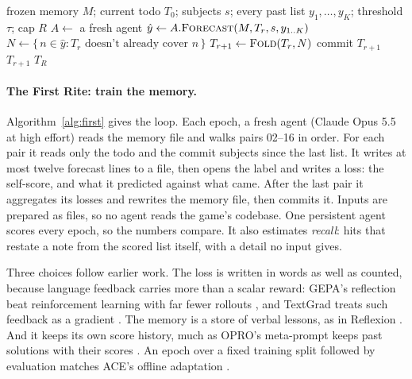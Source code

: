 \documentclass[10pt]{article}
\begin{document}
\begin{algorithm}[t]
  \caption{The Second Rite: freeze the memory, converge the todo}
  \label{alg:second}
  \small
  \begin{algorithmic}[1]
    \Require frozen memory $M$; current todo $T_0$; subjects $s$; every past list $y_1, \dots, y_K$; threshold $\tau$; cap $R$
      \State $A \gets$ a fresh agent 
      \State $\hat{y} \gets A.\textsc{Forecast}(M, T_r, s, y_{1..K})$ 
      \State $N \gets \{\, n \in \hat{y} : T_r \text{ doesn't already cover } n \,\}$ 
      \State $T_{r+1} \gets \textsc{Fold}(T_r, N)$ 
      \State commit $T_{r+1}$
        \State \Return $T_{r+1}$ 
      \EndIf
    \EndFor
    \State \Return $T_R$
  \end{algorithmic}
\end{algorithm}

\paragraph{The First Rite: train the memory.} Algorithm~\ref{alg:first} gives the loop. Each epoch, a fresh agent (Claude Opus 5.5 at high effort) reads the memory file and walks pairs 02--16 in order. For each pair it reads only the todo and the commit subjects since the last list. It writes at most twelve forecast lines to a file, then opens the label and writes a loss: the self-score, and what it predicted against what came. After the last pair it aggregates its losses and rewrites the memory file, then commits it. Inputs are prepared as files, so no agent reads the game's codebase. One persistent agent scores every epoch, so the numbers compare. It also estimates \emph{recall}: hits that restate a note from the scored list itself, with a detail no input gives.

Three choices follow earlier work. The loss is written in words as well as counted, because language feedback carries more than a scalar reward: GEPA's reflection beat reinforcement learning with far fewer rollouts \citep{agrawal2026gepa}, and TextGrad treats such feedback as a gradient \citep{yuksekgonul2024textgrad}. The memory is a store of verbal lessons, as in Reflexion \citep{shinn2023reflexion}. And it keeps its own score history, much as OPRO's meta-prompt keeps past solutions with their scores \citep{yang2023opro}. An epoch over a fixed training split followed by evaluation matches ACE's offline adaptation \citep{zhang2026ace}.
\end{document}
